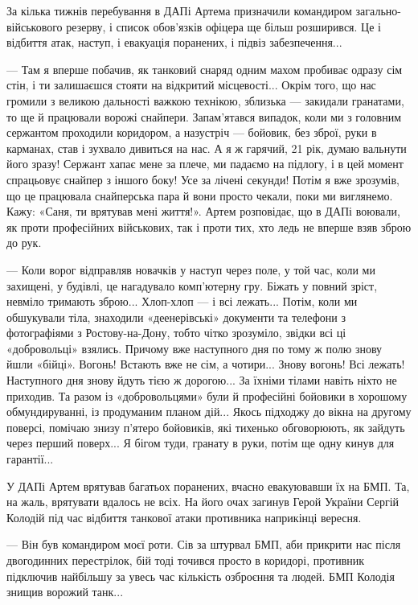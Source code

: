 За кілька тижнів перебування в ДАПі Артема призначили командиром
загально-військового резерву, і список обов’язків офіцера ще більш розширився.
Це і відбиття атак, наступ, і евакуація поранених, і підвіз забезпечення...

— Там я вперше побачив, як танковий снаряд одним махом пробиває одразу сім стін, і ти залишаєшся стояти на відкритий місцевості... Окрім того, що нас громили з великою дальності важкою технікою, зблизька — закидали гранатами, то ще й працювали ворожі снайпери. Запам’ятався випадок, коли ми з головним сержантом проходили коридором, а назустріч — бойовик, без зброї, руки в карманах, став і зухвало дивиться на нас. А я ж гарячий, 21 рік, думаю вальнути його зразу! Сержант хапає мене за плече, ми падаємо на підлогу, і в цей момент спрацьовує снайпер з іншого боку! Усе за лічені секунди! Потім я вже зрозумів, що це працювала снайперська пара й вони просто чекали, поки ми виглянемо. Кажу: «Саня, ти врятував мені життя!».
Артем розповідає, що в ДАПі воювали, як проти професійних військових, так і проти тих, хто ледь не вперше взяв зброю до рук.

— Коли ворог відправляв новачків у наступ через поле, у той час, коли ми
захищені, у будівлі, це нагадувало комп’ютерну гру. Біжать у повний зріст,
невміло тримають зброю... Хлоп-хлоп — і всі лежать... Потім, коли ми обшукували
тіла, знаходили «деенерівські» документи та телефони з фотографіями з
Ростову-на-Дону, тобто чітко зрозуміло, звідки всі ці «добровольці» взялись.
Причому вже наступного дня по тому ж полю знову йшли «бійці». Вогонь! Встають
вже не сім, а чотири... Знову вогонь! Всі лежать! Наступного дня знову йдуть
тією ж дорогою... За їхніми тілами навіть ніхто не приходив. Та разом із
«добровольцями» були й професійні бойовики в хорошому обмундируванні, із
продуманим планом дій... Якось підходжу до вікна на другому поверсі, помічаю
знизу п’ятеро бойовиків, які тихенько обговорюють, як зайдуть через перший
поверх... Я бігом туди, гранату в руки, потім ще одну кинув для гарантії...

У ДАПі Артем врятував багатьох поранених, вчасно евакуювавши їх на БМП. Та, на
жаль, врятувати вдалось не всіх. На його очах загинув Герой України Сергій
Колодій під час відбиття танкової атаки противника наприкінці вересня.

— Він був командиром моєї роти. Сів за штурвал БМП, аби прикрити нас після
двогодинних перестрілок, бій тоді точився просто в коридорі, противник
підключив найбільшу за увесь час кількість озброєння та людей. БМП Колодія
знищив ворожий танк...

